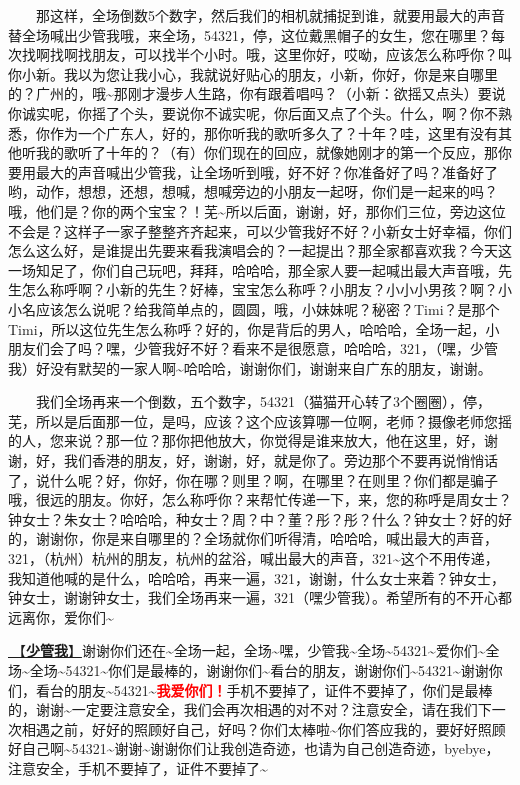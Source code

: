 \documentclass[]{ctexbook}
\begin{document}
  那这样，全场倒数5个数字，然后我们的相机就捕捉到谁，就要用最大的声音替全场喊出少管我哦，来全场，54321，停，这位戴黑帽子的女生，您在哪里？每次找啊找啊找朋友，可以找半个小时。哦，这里你好，哎呦，应该怎么称呼你？叫你小新。我以为您让我小心，我就说好贴心的朋友，小新，你好，你是来自哪里的？广州的，哦\textasciitilde 那刚才漫步人生路，你有跟着唱吗？（小新：欲摇又点头）要说你诚实呢，你摇了个头，要说你不诚实呢，你后面又点了个头。什么，啊？你不熟悉，你作为一个广东人，好的，那你听我的歌听多久了？十年？哇，这里有没有其他听我的歌听了十年的？（有）你们现在的回应，就像她刚才的第一个反应，那你要用最大的声音喊出少管我，让全场听到哦，好不好？你准备好了吗？准备好了哟，动作，想想，还想，想喊，想喊旁边的小朋友一起呀，你们是一起来的吗？哦，他们是？你的两个宝宝？！芜\textasciitilde 所以后面，谢谢，好，那你们三位，旁边这位不会是？这样子一家子整整齐齐起来，可以少管我好不好？小新女士好幸福，你们怎么这么好，是谁提出先要来看我演唱会的？一起提出？那全家都喜欢我？今天这一场知足了，你们自己玩吧，拜拜，哈哈哈，那全家人要一起喊出最大声音哦，先生怎么称呼啊？小新的先生？好棒，宝宝怎么称呼？小朋友？小小小男孩？啊？小小名应该怎么说呢？给我简单点的，圆圆，哦，小妹妹呢？秘密？Timi？是那个Timi，所以这位先生怎么称呼？好的，你是背后的男人，哈哈哈，全场一起，小朋友们会了吗？嘿，少管我好不好？看来不是很愿意，哈哈哈，321，（嘿，少管我）好没有默契的一家人啊\textasciitilde 哈哈哈，谢谢你们，谢谢来自广东的朋友，谢谢。

  我们全场再来一个倒数，五个数字，54321（猫猫开心转了3个圈圈），停，芜，所以是后面那一位，是吗，应该？这个应该算哪一位啊，老师？摄像老师您摇的人，您来说？那一位？那你把他放大，你觉得是谁来放大，他在这里，好，谢谢，好，我们香港的朋友，好，谢谢，好，就是你了。旁边那个不要再说悄悄话了，说什么呢？好，你好，你在哪？则里？啊，在哪里？在则里？你们都是骗子哦，很远的朋友。你好，怎么称呼你？来帮忙传递一下，来，您的称呼是周女士？钟女士？朱女士？哈哈哈，种女士？周？中？董？彤？彤？什么？钟女士？好的好的，谢谢你，你是来自哪里的？全场就你们听得清，哈哈哈，喊出最大的声音，321，（杭州）杭州的朋友，杭州的盆浴，喊出最大的声音，321\textasciitilde 这个不用传递，我知道他喊的是什么，哈哈哈，再来一遍，321，谢谢，什么女士来着？钟女士，钟女士，谢谢钟女士，我们全场再来一遍，321（嘿少管我）。希望所有的不开心都远离你，爱你们\textasciitilde{}

\hyperref[watch-ur-manners]{🎵【\textbf{少管我}】}谢谢你们还在\textasciitilde 全场一起，全场\textasciitilde 嘿，少管我\textasciitilde 全场\textasciitilde54321\textasciitilde 爱你们\textasciitilde 全场\textasciitilde 全场\textasciitilde54321\textasciitilde 你们是最棒的，谢谢你们\textasciitilde 看台的朋友，谢谢你们\textasciitilde54321\textasciitilde 谢谢你们，看台的朋友\textasciitilde54321\textasciitilde{}\textbf{\textcolor{red}{我爱你们！}}手机不要掉了，证件不要掉了，你们是最棒的，谢谢\textasciitilde 一定要注意安全，我们会再次相遇的对不对？注意安全，请在我们下一次相遇之前，好好的照顾好自己，好吗？你们太棒啦\textasciitilde 你们答应我的，要好好照顾好自己啊\textasciitilde54321\textasciitilde 谢谢\textasciitilde 谢谢你们让我创造奇迹，也请为自己创造奇迹，byebye，注意安全，手机不要掉了，证件不要掉了\textasciitilde{}
\end{document}
